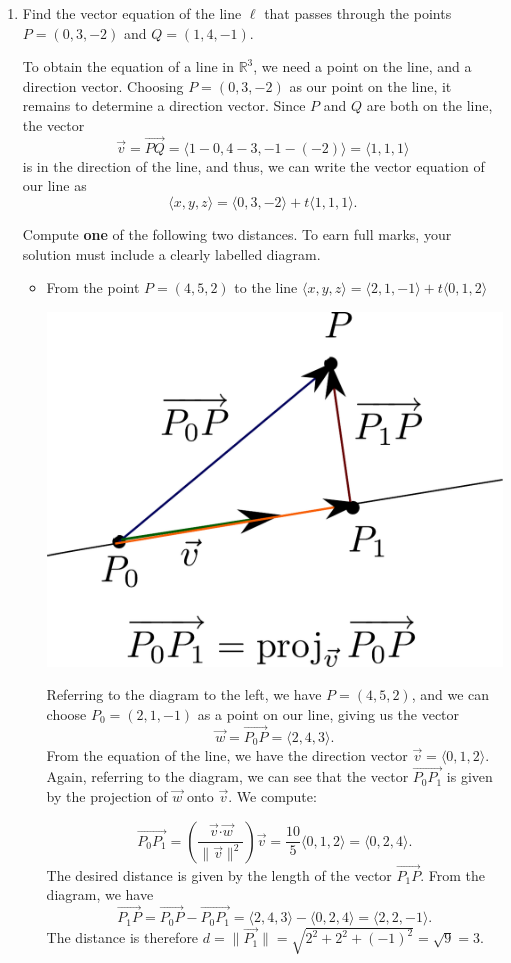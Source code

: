 \documentclass[12pt]{article}
\newcommand{\points}[1]{\marginpar{\hspace{24pt}[#1]}}
\newcommand{\R}{\mathbb{R}}
\newcommand{\dotp}{\boldsymbol{\cdot}}
\newcommand{\len}[1]{\lVert #1\rVert}
\begin{document}
\begin{enumerate}
\item Find the vector equation of the line $\ell$ that passes through the points $P=(0, 3, -2)$ and $Q=(1, 4, -1)$. \points{4}

\bigskip

To obtain the equation of a line in $\R^3$, we need a point on the line, and a direction vector. Choosing $P=(0,3,-2)$ as our point on the line, it remains to determine a direction vector. Since $P$ and $Q$ are both on the line, the vector
\[
 \vec{v} = \overrightarrow{PQ} = \langle 1-0, 4-3, -1-(-2)\rangle = \langle 1,1,1\rangle
\]
is in the direction of the line, and thus, we can write the vector equation of our line as
\[
 \langle x,y,z\rangle = \langle 0,3,-2\rangle + t\langle 1,1,1\rangle.
\]


Compute \textbf{one} of the following two distances. \points{6} To earn full marks, your solution must include a clearly labelled diagram.
\begin{itemize}
\item From the point $P=(4, 5, 2)$ to the line $\langle x,y,z\rangle = \langle 2,1,-1\rangle + t\langle 0,1,2 \rangle$ 

\medskip

\begin{multicols}{2}
 \begin{center}
  \includegraphics[width=0.75\columnwidth]{WS3-3}
 \end{center}
\columnbreak

Referring to the diagram to the left, we have $P=(4,5,2)$, and we can choose $P_0 = (2,1,-1)$ as a point on our line, giving us the vector
\[
 \vec{w} = \overrightarrow{P_0P} = \langle 2,4,3\rangle.
\]
From the equation of the line, we have the direction vector $\vec{v} = \langle 0,1,2\rangle$. Again, referring to the diagram, we can see that the vector $\overrightarrow{P_0P_1}$ is given by the projection of $\vec{w}$ onto $\vec{v}$. We compute:
\end{multicols}
\[
 \overrightarrow{P_0P_1} = \left(\frac{\vec{v}\dotp\vec{w}}{\len{\vec{v}}^2}\right)\vec{v} = \frac{10}{5}\langle 0,1,2\rangle = \langle 0,2,4\rangle.
\]
The desired distance is given by the length of the vector $\overrightarrow{P_1P}$. From the diagram, we have
\[
 \overrightarrow{P_1P} = \overrightarrow{P_0P}-\overrightarrow{P_0P_1} = \langle 2,4,3\rangle - \langle 0,2,4\rangle = \langle 2,2,-1\rangle.
\]
The distance is therefore $d=\len{\overrightarrow{P_1}} = \sqrt{2^2+2^2+(-1)^2} = \sqrt{9}=3$.


\end{itemize}
\end{enumerate}
\end{document}
